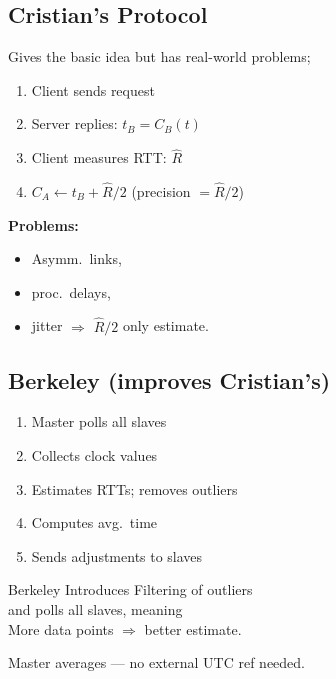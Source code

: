 \documentclass[10pt,a4paper]{article}
\begin{document}
\begin{minipage}[t]{0.38\textwidth}
\subsection*{Cristian's Protocol}
Gives the basic idea but has real-world problems;
\begin{enumerate}
  \item Client sends request
  \item Server replies: $t_B = C_B(t)$
  \item Client measures RTT: $\hat{R}$
  \item $C_A \leftarrow t_B + \hat{R}/2$ \; (precision $= \hat{R}/2$)
\end{enumerate}
\begin{warnbox}
\textbf{Problems:}
\begin{itemize}
\item Asymm.\ links,
\item proc.\ delays,
\item jitter $\Rightarrow$ $\hat{R}/2$ only estimate.
\end{itemize} 
\end{warnbox}
\vspace{3pt}
\subsection*{Berkeley (improves Cristian's)}
\begin{enumerate}
  \item Master polls all slaves
  \item Collects clock values
  \item Estimates RTTs; removes outliers
  \item Computes avg.\ time
  \item Sends adjustments to slaves
\end{enumerate}
\begin{keybox}
Berkeley Introduces Filtering of outliers\\
and polls all slaves, meaning \\
More data points $\Rightarrow$  better estimate.
\end{keybox}
\begin{notebox}
\small Master averages --- no external UTC ref needed.
\end{notebox}
\end{minipage}\hfill
\end{document}

